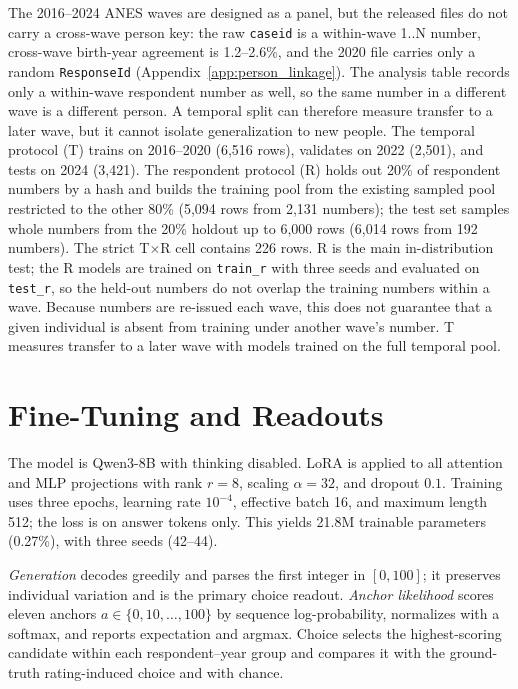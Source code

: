 The 2016--2024 ANES waves are designed as a panel, but the released files do
not carry a cross-wave person key: the raw \texttt{caseid} is a within-wave
1..N number, cross-wave birth-year agreement is 1.2--2.6\%, and the 2020 file
carries only a random \texttt{ResponseId} (Appendix~\ref{app:person_linkage}).
The analysis table records only a within-wave respondent number as well, so the
same number in a different wave is a different person. A temporal split can
therefore measure transfer to a later wave, but it cannot isolate
generalization to new people. The temporal protocol (T)
trains on 2016--2020 (6,516 rows), validates on 2022 (2,501), and tests on 2024
(3,421). The respondent protocol (R) holds out 20\% of respondent numbers by a
hash and builds the training pool from the existing sampled pool restricted to
the other 80\% (5,094 rows from 2,131 numbers); the test set samples whole
numbers from the 20\% holdout up to 6,000 rows (6,014 rows from 192 numbers).
The strict T$\times$R cell contains 226 rows. R is the main in-distribution
test; the R models are trained on \texttt{train\_r} with three seeds and
evaluated on \texttt{test\_r}, so the held-out numbers do not overlap the
training numbers within a wave. Because numbers are re-issued each wave, this
does not guarantee that a given individual is absent from training under
another wave's number. T measures transfer to a later wave with models trained on
the full temporal pool.

\section{Fine-Tuning and Readouts}

The model is Qwen3-8B \citep{yang2025qwen3} with thinking disabled. LoRA
\citep{hu2022lora} is applied to all attention and MLP projections with rank
$r=8$, scaling $\alpha=32$, and dropout $0.1$. Training uses three epochs,
learning rate $10^{-4}$, effective batch 16, and maximum length 512; the loss is
on answer tokens only. This yields 21.8M trainable parameters (0.27\%), with
three seeds (42--44).

\emph{Generation} decodes greedily and parses the first integer in $[0,100]$; it
preserves individual variation and is the primary choice readout. \emph{Anchor
likelihood} scores eleven anchors $a\in\{0,10,\dots,100\}$ by sequence
log-probability, normalizes with a softmax, and reports expectation and argmax.
Choice selects the highest-scoring candidate within each respondent--year group
and compares it with the ground-truth rating-induced choice and with chance.

